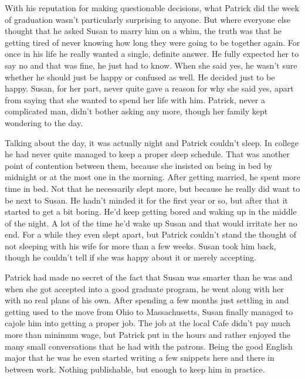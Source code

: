 \documentclass[11pt,letterpaper]{article}
\begin{document}
With his reputation for making questionable decisions, what Patrick did the week of graduation wasn't particularly surprising to anyone. But where everyone else thought that he asked Susan to marry him on a whim, the truth was that he getting tired of never knowing how long they were going to be together again. For once in his life he really wanted a single, definite answer. He fully expected her to say no and that was fine, he just had to know. When she said yes, he wasn't sure whether he should just be happy or confused as well. He decided just to be happy. Susan, for her part, never quite gave a reason for why she said yes, apart from saying that she wanted to spend her life with him. Patrick, never a complicated man, didn't bother asking any more, though her family kept wondering to the day.

Talking about the day, it was actually night and Patrick couldn't sleep. In college he had never quite managed to keep a proper sleep schedule. That was another point of contention between them, because she insisted on being in bed by midnight or at the most one in the morning. After getting married, he spent more time in bed. Not that he necessarily slept more, but because he really did want to be next to Susan. He hadn't minded it for the first year or so, but after that it started to get a bit boring. He'd keep getting bored and waking up in the middle of the night. A lot of the time he'd wake up Susan and that would irritate her no end. For a while they even slept apart, but Patrick couldn't stand the thought of not sleeping with his wife for more than a few weeks. Susan took him back, though he couldn't tell if she was happy about it or merely accepting.

Patrick had made no secret of the fact that Susan was smarter than he was and when she got accepted into a good graduate program, he went along with her with no real plans of his own. After spending a few months just settling in and getting used to the move from Ohio to Massachusetts, Susan finally managed to cajole him into getting a proper job. The job at the local Cafe didn't pay much more than minimum wage, but Patrick put in the hours and rather enjoyed the many small conversations that he had with the patrons. Being the good English major that he was he even started writing a few snippets here and there in between work. Nothing publishable, but enough to keep him in practice.
\end{document}
